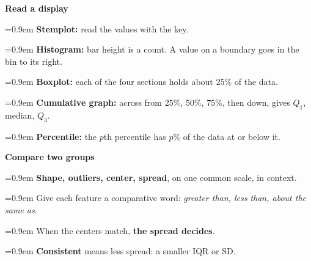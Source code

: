 \documentclass[10pt]{article}
\newlength{\sheetwd}\setlength{\sheetwd}{7.8in}
\newlength{\sheetmaxht}\setlength{\sheetmaxht}{4.8in}
\newcommand{\sheethead}[1]{%
  \par\addvspace{8pt}\noindent
  {\color{cerulean}\sffamily\bfseries #1}\par\nopagebreak
  \vspace{-7pt}\noindent{\color{cerulean}\rule{\linewidth}{0.6pt}}\par\nopagebreak\vspace{-1pt}}
\newcommand{\sheetitem}[1]{\par\noindent\hangindent=0.9em\hangafter=1 #1\par}
\begin{document}
\begin{lrbox}{\sheet}
\begin{minipage}[t]{\sheetwd}
\begin{minipage}[t]{0.485\linewidth}
\sheethead{Read a display}
\sheetitem{\textbf{Stemplot:} read the values with the key.}
\sheetitem{\textbf{Histogram:} bar height is a count. A value on a boundary goes in the bin to
  its right.}
\sheetitem{\textbf{Boxplot:} each of the four sections holds about $25\%$ of the data.}
\sheetitem{\textbf{Cumulative graph:} across from $25\%$, $50\%$, $75\%$, then down, gives $Q_1$,
  median, $Q_3$.}
\sheetitem{\textbf{Percentile:} the $p$th percentile has $p\%$ of the data at or below it.}

\sheethead{Compare two groups}
\sheetitem{\textbf{Shape, outliers, center, spread}, on one common scale, in context.}
\sheetitem{Give each feature a comparative word: \emph{greater than, less than, about the same
  as}.}
\sheetitem{When the centers match, \textbf{the spread decides}.}
\sheetitem{\textbf{Consistent} means less spread: a smaller IQR or SD.}
\end{minipage}
\end{minipage}%
\end{lrbox}

\newlength{\sheetht}\setlength{\sheetht}{\dimexpr\ht\sheet+\dp\sheet\relax}
\ifdim\sheetht>\sheetmaxht \errmessage{Cheat sheet is taller than a half page}\fi

\null
{}
\end{document}
